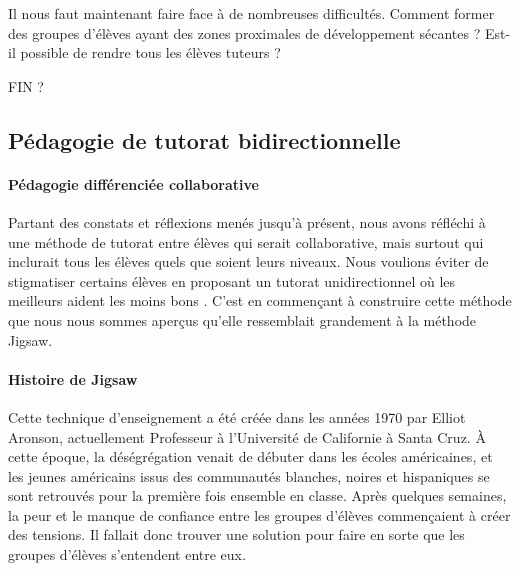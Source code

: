 Il nous faut maintenant faire face à de nombreuses difficultés. Comment former des groupes d'élèves ayant des zones proximales de développement sécantes ? Est-il possible de rendre tous les élèves tuteurs ? 



\vspace{1cm}

{\Huge FIN ?}

\subsection{Pédagogie de tutorat bidirectionnelle}
\paragraph{Pédagogie différenciée collaborative}
Partant des constats et réflexions menés jusqu'à présent, nous avons réfléchi à une méthode de tutorat entre élèves qui serait collaborative, mais surtout qui inclurait tous les élèves quels que soient leurs niveaux. Nous voulions éviter de stigmatiser certains élèves en proposant un tutorat unidirectionnel où les \og meilleurs \fg{} aident les \og moins bons \fg{}. C'est en commençant à construire cette méthode que nous nous sommes aperçus qu'elle ressemblait grandement à la méthode Jigsaw.

\paragraph{Histoire de Jigsaw}
Cette technique d'enseignement a été créée dans les années 1970 par Elliot Aronson, actuellement Professeur à l'Université de Californie à Santa Cruz. À cette époque, la déségrégation venait de débuter dans les écoles américaines, et les jeunes américains issus des communautés blanches, noires et hispaniques se sont retrouvés pour la première fois ensemble en classe. Après quelques semaines, la peur et le manque de confiance entre les groupes d'élèves commençaient à créer des tensions. Il fallait donc trouver une solution pour faire en sorte que les groupes d'élèves s'entendent entre eux.


